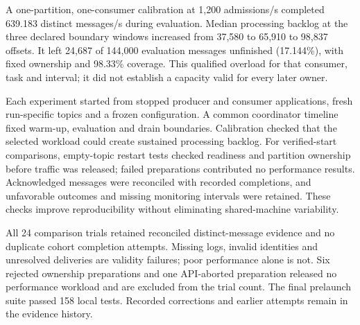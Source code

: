 A one-partition, one-consumer calibration at 1,200 admissions/s completed 639.183 distinct messages/s during evaluation. Median processing backlog at the three declared boundary windows increased from 37,580 to 65,910 to 98,837 offsets. It left 24,687 of 144,000 evaluation messages unfinished (17.144\%), with fixed ownership and 98.33\% coverage. This qualified overload for that consumer, task and interval; it did not establish a capacity valid for every later owner.

Each experiment started from stopped producer and consumer applications, fresh run-specific topics and a frozen configuration. A common coordinator timeline fixed warm-up, evaluation and drain boundaries. Calibration checked that the selected workload could create sustained processing backlog. For verified-start comparisons, empty-topic restart tests checked readiness and partition ownership before traffic was released; failed preparations contributed no performance results. Acknowledged messages were reconciled with recorded completions, and unfavorable outcomes and missing monitoring intervals were retained. These checks improve reproducibility without eliminating shared-machine variability.

All 24 comparison trials retained reconciled distinct-message evidence and no duplicate cohort completion attempts. Missing logs, invalid identities and unresolved deliveries are validity failures; poor performance alone is not. Six rejected ownership preparations and one API-aborted preparation released no performance workload and are excluded from the trial count. The final prelaunch suite passed 158 local tests. Recorded corrections and earlier attempts remain in the evidence history.


